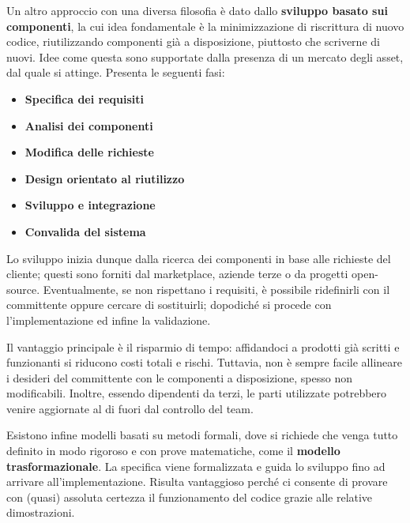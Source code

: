 \noindent Un altro approccio con una diversa filosofia è dato dallo \textbf{sviluppo basato sui componenti}, la cui idea fondamentale è la
minimizzazione di riscrittura di nuovo codice, riutilizzando componenti già a disposizione, piuttosto che scriverne di nuovi. Idee come questa sono
supportate dalla presenza di un mercato degli asset, dal quale si attinge. Presenta le seguenti fasi: \begin{itemize}
	\item \textbf{Specifica dei requisiti}
	\item \textbf{Analisi dei componenti}
	\item \textbf{Modifica delle richieste}
	\item \textbf{Design orientato al riutilizzo}
	\item \textbf{Sviluppo e integrazione}
	\item \textbf{Convalida del sistema}
\end{itemize}
\noindent Lo sviluppo inizia dunque dalla ricerca dei componenti in base alle richieste del cliente; questi sono forniti dal marketplace, aziende terze
o da progetti open-source. Eventualmente, se non rispettano i requisiti, è possibile ridefinirli con il committente oppure cercare di sostituirli;
dopodiché si procede con l'implementazione ed infine la validazione.\par
Il vantaggio principale è il risparmio di tempo: affidandoci a prodotti già scritti e funzionanti si riducono costi totali e rischi. Tuttavia, non è
sempre facile allineare i desideri del committente con le componenti a disposizione, spesso non modificabili. Inoltre, essendo dipendenti da terzi, le
parti utilizzate potrebbero venire aggiornate al di fuori dal controllo del team.\par
Esistono infine modelli basati su metodi formali, dove si richiede che venga tutto definito in modo rigoroso e con prove matematiche, come il
\textbf{modello trasformazionale}. La specifica viene formalizzata e guida lo sviluppo fino ad arrivare all'implementazione. Risulta vantaggioso perché
ci consente di provare con (quasi) assoluta certezza il funzionamento del codice grazie alle relative dimostrazioni.\newline

